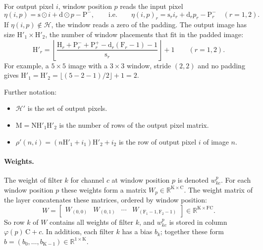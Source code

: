 \documentclass[twoside,11pt]{article}
\newcommand{\const}[1]{\ensuremath{\mathrm{#1}}} %
\newcommand{\Reals}{\mathbb{R}}
\newcommand{\Hin}{\const{H}}         %
\newcommand{\Hout}{\const{H}'}       %
\newcommand{\Fs}{\const{F}}          %
\newcommand{\Pb}{\const{P}^{-}}      %
\newcommand{\Pa}{\const{P}^{+}}      %
\newcommand{\cstr}{\const{s}}         %
\newcommand{\dil}{\const{d}}         %
\newcommand{\pix}{\mathcal{H}}       %
\newcommand{\outpix}{\mathcal{H}'}   %
\begin{document}
For output pixel $i$, window position $p$ reads the input pixel
\begin{equation} \label{eq:source-pixel}
\eta(i, p) = \cstr \odot i + \dil \odot p - \Pb,
\qquad\text{i.e.}\qquad
\eta(i,p)_r = \cstr_r i_r + \dil_r p_r - \Pb_r \quad (r = 1, 2).
\end{equation}
If $\eta(i, p) \notin \pix$, the window reads a zero of the padding.
The output image has size $\Hout_1 \times \Hout_2$, the number of window placements that fit in the padded image:
\begin{equation} \label{eq:output-size}
\Hout_r = \left\lfloor \frac{\Hin_r + \Pb_r + \Pa_r - \dil_r (\Fs_r - 1) - 1}{\cstr_r} \right\rfloor + 1 \qquad (r = 1, 2).
\end{equation}
For example, a $5 \times 5$ image with a $3 \times 3$ window, stride $(2,2)$ and no padding gives $\Hout_1 = \Hout_2 = \lfloor (5 - 2 - 1) / 2 \rfloor + 1 = 2$.

Further notation:
\begin{itemize}
\item $\outpix$ is the set of output pixels.
\item $\const{M} = \const{N} \Hout_1 \Hout_2$ is the number of rows of the output pixel matrix.
\item $\rho'(n, i) = (n \Hout_1 + i_1) \Hout_2 + i_2$ is the row of output pixel $i$ of image $n$.
\end{itemize}

\paragraph{Weights.}
The weight of filter $k$ for channel $c$ at window position $p$ is denoted $w^{p}_{kc}$.
For each window position $p$ these weights form a matrix $W_p \in \Reals^{\const{K} \times \const{C}}$.
The weight matrix of the layer concatenates these matrices, ordered by window position:
\[
W = \begin{bmatrix} W_{(0,0)} & W_{(0,1)} & \cdots & W_{(\Fs_1 - 1, \Fs_2 - 1)} \end{bmatrix} \in \Reals^{\const{K} \times \Fs \const{C}}.
\]
So row $k$ of $W$ contains all weights of filter $k$, and $w^{p}_{kc}$ is stored in column $\varphi(p)\, \const{C} + c$.
In addition, each filter $k$ has a bias $b_k$; together these form $b = (b_0, \ldots, b_{\const{K}-1}) \in \Reals^{1 \times \const{K}}$.
\end{document}
